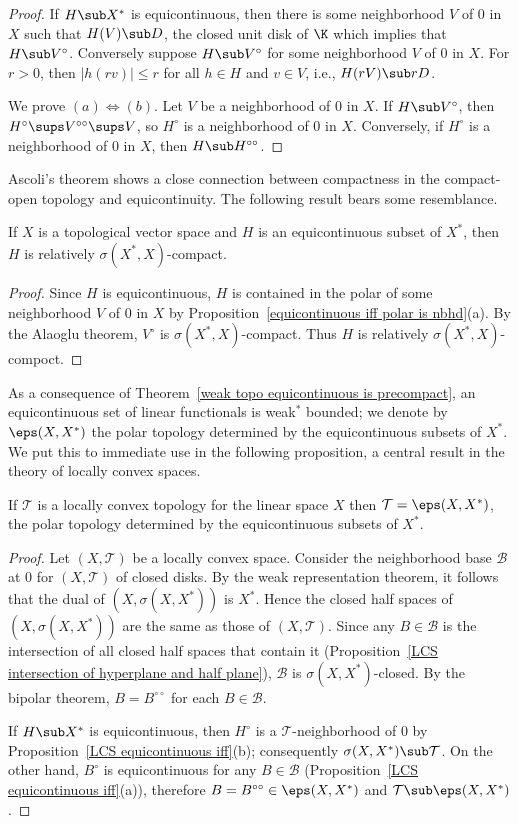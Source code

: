 \begin{proof}
If $H\sub X^*$ is equicontinuous, then there is some neighborhood $V$ of $0$ in $X$ such that $H(V)\sub D$, the closed unit disk of $\K$ which implies that $H\sub V^\circ$. Conversely suppose $H\sub V^\circ$ for some neighborhood $V$ of $0$ in $X$. For $r>0$, then $|h(rv)|\leq r$ for all $h\in H$ and $v\in V$, i.e., $H(rV)\sub rD$.\par
We prove $(a)\Leftrightarrow(b)$. Let $V$ be a neighborhood of $0$ in $X$. If $H\sub V^\circ$, then $H^\circ\sups V^{\circ\circ}\sups V$, so $H^\circ$ is a neighborhood of $0$ in $X$. Conversely, if $H^\circ$ is a neighborhood of $0$ in $X$, then $H\sub H^{\circ\circ}$.
\end{proof}
Ascoli's theorem shows a close connection between compactness in the compact-open topology and equicontinuity. The following result bears some resemblance.
\begin{theorem}\label{weak topo equicontinuous is precompact}
If $X$ is a topological vector space and $H$ is an equicontinuous subset of $X^*$, then $H$ is relatively $\sigma(X^*,X)$-compact.
\end{theorem}
\begin{proof}
Since $H$ is equicontinuous, $H$ is contained in the polar of some neighborhood $V$ of $0$ in $X$ by Proposition~\ref{equicontinuous iff polar is nbhd}(a). By the Alaoglu theorem, $V^\circ$ is $\sigma(X^*,X)$-compact. Thus $H$ is relatively $\sigma(X^*,X)$-compoct.
\end{proof}
As a consequence of Theorem~\ref{weak topo equicontinuous is precompact}, an equicontinuous set of linear functionals is weak$^*$ bounded; we denote by $\eps(X,X^*)$ the polar topology determined by the equicontinuous subsets of $X^*$. We put this to immediate use in the following proposition, a central result in the theory of locally convex spaces.
\begin{proposition}\label{LCS topo is eps(X,X^*)}
If $\mathcal{T}$ is a locally convex topology for the linear space $X$ then $\mathcal{T}=\eps(X,X^*)$, the polar topology determined by the equicontinuous subsets of $X^*$.
\end{proposition}
\begin{proof}
Let $(X,\mathcal{T})$ be a locally convex space. Consider the neighborhood base $\mathcal{B}$ at $0$ for $(X,\mathcal{T})$ of closed disks. By the weak representation theorem, it follows that the dual of $(X,\sigma(X,X^*))$ is $X^*$. Hence the closed half spaces of $(X,\sigma(X,X^*))$ are the same as those of $(X,\mathcal{T})$. Since any $B\in\mathcal{B}$ is the intersection of all closed half spaces that contain it (Proposition~\ref{LCS intersection of hyperplane and half plane}), $\mathcal{B}$ is $\sigma(X,X^*)$-closed. By the bipolar theorem, $B=B^{\circ\circ}$ for each $B\in\mathcal{B}$.\par
If $H\sub X^*$ is equicontinuous, then $H^\circ$ is a $\mathcal{T}$-neighborhood of $0$ by Proposition~\ref{LCS equicontinuous iff}(b); consequently $\sigma(X,X^*)\sub\mathcal{T}$. On the other hand, $B^\circ$ is equicontinuous for any $B\in\mathcal{B}$ (Proposition~\ref{LCS equicontinuous iff}(a)), therefore $B=B^{\circ\circ}\in\eps(X,X^*)$ and $\mathcal{T}\sub\eps(X,X^*)$.
\end{proof}
